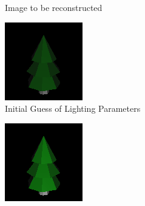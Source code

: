 \documentclass{juliacon}
\begin{document}
\begin{figure}[!htb]
\begin{subfigure}[c]{0.45\textwidth}
\begin{subfigure}[c]{0.45\textwidth}
            \caption{Image to be reconstructed}
            \label{fig:target_light}
        \end{subfigure}
        \hfill
        \begin{subfigure}[c]{0.45\textwidth}
            \centering
            \includegraphics[width=\textwidth]{images/light/initial.png}
            \caption{Initial Guess of Lighting Parameters}
            \label{fig:guess_light}
        \end{subfigure}
        \centering
        \hfill
        \begin{subfigure}[c]{0.45\textwidth}
            \centering
            \includegraphics[width=\textwidth]{images/light/161.png}

\end{subfigure}
\end{subfigure}
\end{figure}
\end{document}
